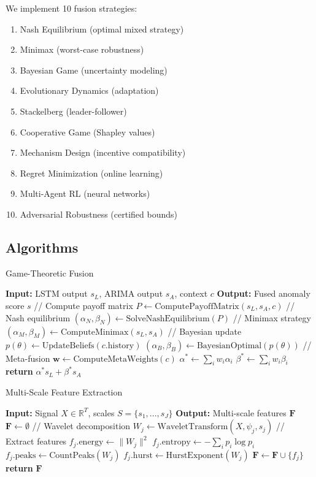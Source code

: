 \documentclass[10pt,conference]{IEEEtran}
\begin{document}
We implement 10 fusion strategies:
\begin{enumerate}
    \item Nash Equilibrium (optimal mixed strategy)
    \item Minimax (worst-case robustness)
    \item Bayesian Game (uncertainty modeling)
    \item Evolutionary Dynamics (adaptation)
    \item Stackelberg (leader-follower)
    \item Cooperative Game (Shapley values)
    \item Mechanism Design (incentive compatibility)
    \item Regret Minimization (online learning)
    \item Multi-Agent RL (neural networks)
    \item Adversarial Robustness (certified bounds)
\end{enumerate}

\subsection{Algorithms}

\begin{algorithm}[t]
\caption{Game-Theoretic Fusion}
\label{alg:fusion}
\begin{algorithmic}[1]
\STATE \textbf{Input:} LSTM output $s_L$, ARIMA output $s_A$, context $c$
\STATE \textbf{Output:} Fused anomaly score $s$
\STATE // Compute payoff matrix
\STATE $P \gets \text{ComputePayoffMatrix}(s_L, s_A, c)$
\STATE // Nash equilibrium
\STATE $(\alpha_N, \beta_N) \gets \text{SolveNashEquilibrium}(P)$
\STATE // Minimax strategy
\STATE $(\alpha_M, \beta_M) \gets \text{ComputeMinimax}(s_L, s_A)$
\STATE // Bayesian update
\STATE $p(\theta) \gets \text{UpdateBeliefs}(c.\text{history})$
\STATE $(\alpha_B, \beta_B) \gets \text{BayesianOptimal}(p(\theta))$
\STATE // Meta-fusion
\STATE $\mathbf{w} \gets \text{ComputeMetaWeights}(c)$
\STATE $\alpha^* \gets \sum_i w_i \alpha_i$
\STATE $\beta^* \gets \sum_i w_i \beta_i$
\STATE \textbf{return} $\alpha^* s_L + \beta^* s_A$
\end{algorithmic}
\end{algorithm}

\begin{algorithm}[t]
\caption{Multi-Scale Feature Extraction}
\label{alg:multiscale}
\begin{algorithmic}[1]
\STATE \textbf{Input:} Signal $X \in \mathbb{R}^T$, scales $S = \{s_1, ..., s_J\}$
\STATE \textbf{Output:} Multi-scale features $\mathbf{F}$
\STATE $\mathbf{F} \gets \emptyset$
    \STATE // Wavelet decomposition
    \STATE $W_j \gets \text{WaveletTransform}(X, \psi_j, s_j)$
    \STATE // Extract features
    \STATE $f_j.\text{energy} \gets \|W_j\|^2$
    \STATE $f_j.\text{entropy} \gets -\sum_i p_i \log p_i$
    \STATE $f_j.\text{peaks} \gets \text{CountPeaks}(W_j)$
    \STATE $f_j.\text{hurst} \gets \text{HurstExponent}(W_j)$
    \STATE $\mathbf{F} \gets \mathbf{F} \cup \{f_j\}$
\ENDFOR
\STATE \textbf{return} $\mathbf{F}$
\end{algorithmic}
\end{algorithm}
\end{document}

